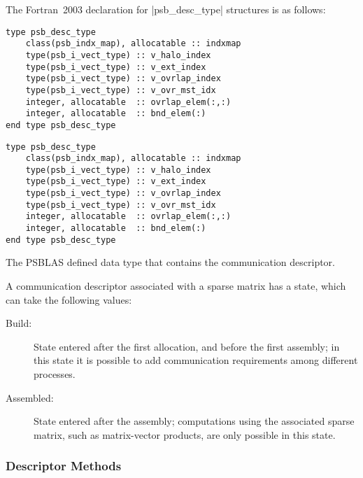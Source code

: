 The Fortran~2003 declaration  for \fortinline|psb_desc_type| structures is 
as follows:
\begin{listing}[h!]
\ifpdf
\begin{verbatim}
type psb_desc_type 
    class(psb_indx_map), allocatable :: indxmap
    type(psb_i_vect_type) :: v_halo_index
    type(psb_i_vect_type) :: v_ext_index
    type(psb_i_vect_type) :: v_ovrlap_index
    type(psb_i_vect_type) :: v_ovr_mst_idx 
    integer, allocatable  :: ovrlap_elem(:,:)
    integer, allocatable  :: bnd_elem(:)
end type psb_desc_type 
\end{verbatim}
\else
\begin{center}
    \begin{minipage}[tl]{0.9\textwidth}
\begin{verbatim} 
type psb_desc_type 
    class(psb_indx_map), allocatable :: indxmap
    type(psb_i_vect_type) :: v_halo_index
    type(psb_i_vect_type) :: v_ext_index
    type(psb_i_vect_type) :: v_ovrlap_index
    type(psb_i_vect_type) :: v_ovr_mst_idx 
    integer, allocatable  :: ovrlap_elem(:,:)
    integer, allocatable  :: bnd_elem(:)
end type psb_desc_type 
\end{verbatim}
    \end{minipage}
  \end{center}
\fi
  \caption{\label{fig:desctype}The PSBLAS defined data type that
    contains the communication descriptor.}
\end{listing}
A communication descriptor associated with a sparse  matrix has a
state, which can take the following values:
\begin{description}
\item[Build:] State entered after the first allocation, and before the
  first assembly; in this state it is possible to add communication
  requirements among different processes. 
\item[Assembled:] State entered after the assembly; computations using
  the associated sparse matrix, such as matrix-vector products, are
  only possible   in this state.
\end{description}

\subsubsection{Descriptor Methods} 


